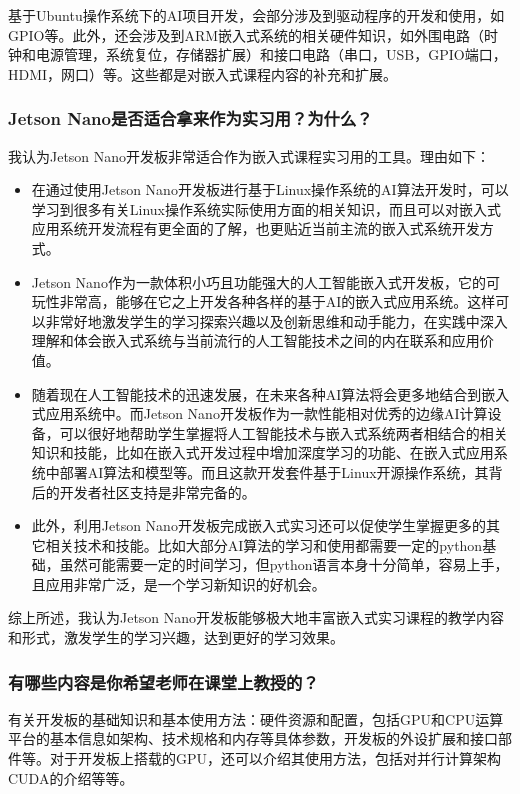 \documentclass[UTF8]{article}
\begin{document}
基于Ubuntu操作系统下的AI项目开发，会部分涉及到驱动程序的开发和使用，如GPIO等。此外，还会涉及到ARM嵌入式系统的相关硬件知识，如外围电路（时钟和电源管理，系统复位，存储器扩展）和接口电路（串口，USB，GPIO端口，HDMI，网口）等。这些都是对嵌入式课程内容的补充和扩展。



\subsubsection{Jetson Nano是否适合拿来作为实习用？为什么？} 
我认为Jetson Nano开发板非常适合作为嵌入式课程实习用的工具。理由如下：
\begin{itemize}
    \item 在通过使用Jetson Nano开发板进行基于Linux操作系统的AI算法开发时，可以学习到很多有关Linux操作系统实际使用方面的相关知识，而且可以对嵌入式应用系统开发流程有更全面的了解，也更贴近当前主流的嵌入式系统开发方式。
    \item Jetson Nano作为一款体积小巧且功能强大的人工智能嵌入式开发板，它的可玩性非常高，能够在它之上开发各种各样的基于AI的嵌入式应用系统。这样可以非常好地激发学生的学习探索兴趣以及创新思维和动手能力，在实践中深入理解和体会嵌入式系统与当前流行的人工智能技术之间的内在联系和应用价值。
    \item 随着现在人工智能技术的迅速发展，在未来各种AI算法将会更多地结合到嵌入式应用系统中。而Jetson Nano开发板作为一款性能相对优秀的边缘AI计算设备，可以很好地帮助学生掌握将人工智能技术与嵌入式系统两者相结合的相关知识和技能，比如在嵌入式开发过程中增加深度学习的功能、在嵌入式应用系统中部署AI算法和模型等。而且这款开发套件基于Linux开源操作系统，其背后的开发者社区支持是非常完备的。
    \item 此外，利用Jetson Nano开发板完成嵌入式实习还可以促使学生掌握更多的其它相关技术和技能。比如大部分AI算法的学习和使用都需要一定的python基础，虽然可能需要一定的时间学习，但python语言本身十分简单，容易上手，且应用非常广泛，是一个学习新知识的好机会。
\end{itemize}

综上所述，我认为Jetson Nano开发板能够极大地丰富嵌入式实习课程的教学内容和形式，激发学生的学习兴趣，达到更好的学习效果。

\subsubsection{有哪些内容是你希望老师在课堂上教授的？} 
有关开发板的基础知识和基本使用方法：硬件资源和配置，包括GPU和CPU运算平台的基本信息如架构、技术规格和内存等具体参数，开发板的外设扩展和接口部件等。对于开发板上搭载的GPU，还可以介绍其使用方法，包括对并行计算架构CUDA的介绍等等。
\end{document}

